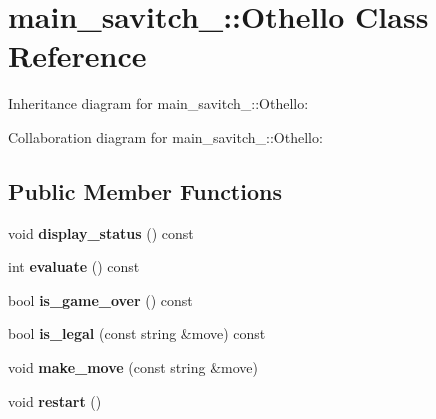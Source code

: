 \hypertarget{classmain__savitch__14_1_1Othello}{}\section{main\+\_\+savitch\+\_\+:\+:Othello Class Reference}
\label{classmain__savitch__14_1_1Othello}


Inheritance diagram for main\+\_\+savitch\+\_\+:\+:Othello\+:


Collaboration diagram for main\+\_\+savitch\+\_\+:\+:Othello\+:
\subsection*{Public Member Functions}
\begin{DoxyCompactItemize}
\item 
void {\bfseries display\+\_\+status} () const \hypertarget{classmain__savitch__14_1_1Othello_a471f0e8f0e63ed32d764682f60110267}{}\label{classmain__savitch__14_1_1Othello_a471f0e8f0e63ed32d764682f60110267}

\item 
int {\bfseries evaluate} () const \hypertarget{classmain__savitch__14_1_1Othello_a1b3239a14882cbc7e7bd44c0b6828514}{}\label{classmain__savitch__14_1_1Othello_a1b3239a14882cbc7e7bd44c0b6828514}

\item 
bool {\bfseries is\+\_\+game\+\_\+over} () const \hypertarget{classmain__savitch__14_1_1Othello_a4387d20f953aab54025760ec3f72f7ca}{}\label{classmain__savitch__14_1_1Othello_a4387d20f953aab54025760ec3f72f7ca}

\item 
bool {\bfseries is\+\_\+legal} (const string \&move) const \hypertarget{classmain__savitch__14_1_1Othello_ab4fb0040d5e1dbe34c33fa11a82285cf}{}\label{classmain__savitch__14_1_1Othello_ab4fb0040d5e1dbe34c33fa11a82285cf}

\item 
void {\bfseries make\+\_\+move} (const string \&move)\hypertarget{classmain__savitch__14_1_1Othello_a1066b280efa5cb41039585669282fe06}{}\label{classmain__savitch__14_1_1Othello_a1066b280efa5cb41039585669282fe06}

\item 
void {\bfseries restart} ()\hypertarget{classmain__savitch__14_1_1Othello_abf872b8074bfa4c04119317dc3b39af2}{}\label{classmain__savitch__14_1_1Othello_abf872b8074bfa4c04119317dc3b39af2}


\end{DoxyCompactItemize}
